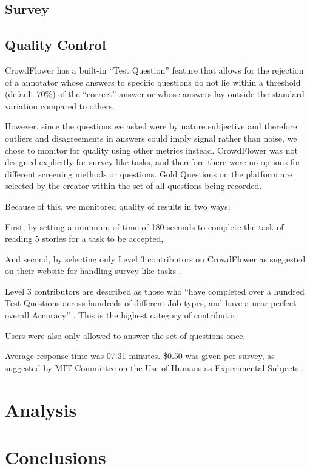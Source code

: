 \subsection{Survey} 
\subsection{Quality Control}

CrowdFlower has a built-in ``Test Question'' feature that allows for the rejection of a annotator whose answers to specific questions do not lie within a threshold (default 70\%) of the ``correct'' answer or whose answers lay outside the standard variation compared to others.

However, since the questions we asked were by nature subjective and therefore outliers and disagreements in answers could imply signal rather than noise, we chose to monitor for quality using other metrics instead. CrowdFlower was not designed explicitly for survey-like tasks, and therefore there were no options for different screening methods or questions. Gold Questions on the platform are selected by the creator within the set of all questions being recorded.

Because of this, we monitored quality of results in two ways:

First, by setting a minimum of time of 180 seconds to complete the task of reading 5 stories for a task to be accepted,

And second, by selecting only Level 3 contributors on CrowdFlower as suggested on their website for handling survey-like tasks \cite{CrowdFlower-guide}.

Level 3 contributors are described as those who ``have completed over a hundred Test Questions across hundreds of different Job types, and have a near perfect overall Accuracy'' \cite{Crowdflower-levels}. This is the highest category of contributor.
 
Users were also only allowed to answer the set of questions once. 

Average response time was 07:31 minutes.
\$0.50 was given per survey, as suggested by MIT Committee on the Use of Humans as Experimental Subjects \cite{COUHES-turk}.
\section{Analysis}
\section{Conclusions}


